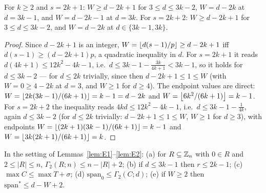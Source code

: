 \begin{lemma}\label{lem:E3}
For $k\ge2$ and $s=2k{+}1$: $W\ge d-2k+1$ for $3\le d\le3k-2$, $W=d-2k$
at $d=3k-1$, and $W=d-2k-1$ at $d=3k$. For $s=2k{+}2$: $W\ge d-2k+1$
for $3\le d\le3k-2$, and $W=d-2k$ at $d\in\{3k-1,3k\}$.
\end{lemma}

\begin{proof}
Since $d-2k+1$ is an integer, $W=\left\lfloor d(s-1)/p \right\rfloor\ge d-2k+1$ iff
$d(s-1)\ge(d-2k+1)p$, a quadratic inequality in $d$. For $s=2k+1$ it
reads $d(4k+1)\le12k^2-4k-1$, i.e.\
$d\le3k-1-\frac{3k}{4k+1}<3k-1$, so it holds for $d\le3k-2$ --- for
$d\le2k$ trivially, since then $d-2k+1\le1\le W$ (with $W=0\ge4-2k$ at
$d=3$, and $W\ge1$ for $d\ge4$). The endpoint values are direct:
$W=\left\lfloor 2k(3k-1)/(6k+1) \right\rfloor=k-1=d-2k$ and $W=\left\lfloor 6k^2/(6k+1) \right\rfloor=k-1$.
For $s=2k+2$ the inequality reads $4kd\le12k^2-4k-1$, i.e.\
$d\le3k-1-\frac1{4k}$, again $d\le3k-2$ (for $d\le2k$ trivially:
$d-2k+1\le1\le W$, $W\ge1$ for $d\ge3$), with endpoints
$W=\left\lfloor (2k+1)(3k-1)/(6k+1) \right\rfloor=k-1$ and
$W=\left\lfloor 3k(2k+1)/(6k+1) \right\rfloor=k$.
\end{proof}

\begin{lemma}\label{lem:E4}
In the setting of Lemmas~\ref{lem:E1}--\ref{lem:E2}:
\textup{(a)} for $R\subseteq\mathbb{Z}_n$ with $0\in R$ and $2\le|R|\le n$,
$\Gamma_2(R;n)\le n-|R|+2$;
\textup{(b)} if $d\le3k-1$ then $r\le2k-1$;
\textup{(c)} $\max C\le\max T+\sigma$;
\textup{(d)} $\mathrm{span}_0\le\Gamma_2(C;d)$;
\textup{(e)} if $W\ge2$ then $\mathrm{span}^\ast\le d-W+2$.
\end{lemma}

